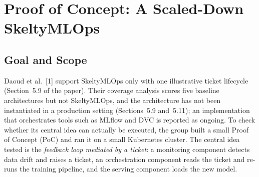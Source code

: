 %
%
%

\providecommand{\papercite}{[1]}

\section{Proof of Concept: A Scaled-Down SkeltyMLOps}
\label{sec:poc}

\subsection{Goal and Scope}

Daoud et al.~\papercite{} support SkeltyMLOps only with one illustrative ticket lifecycle (Section~5.9 of the paper). Their coverage analysis scores five baseline architectures but not SkeltyMLOps, and the architecture has not been instantiated in a production setting (Sections~5.9 and~5.11); an implementation that orchestrates tools such as MLflow and DVC is reported as ongoing. To check whether its central idea can actually be executed, the group built a small Proof of Concept (PoC) and ran it on a small Kubernetes cluster. The central idea tested is the \emph{feedback loop mediated by a ticket}: a monitoring component detects data drift and raises a ticket, an orchestration component reads the ticket and re-runs the training pipeline, and the serving component loads the new model.

